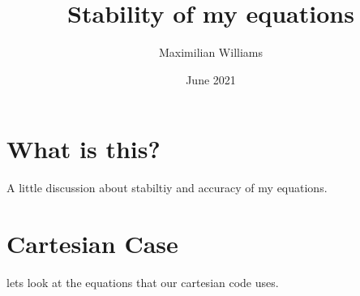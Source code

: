 \documentclass{article}
\title{Stability of my equations}
\author{Maximilian Williams}
\date{June 2021}
\begin{document}
\maketitle

\section*{What is this?}
A little discussion about stabiltiy and accuracy of my equations.


\section*{Cartesian Case}
lets look at the equations that our cartesian code uses. 
\newline
\end{document}

